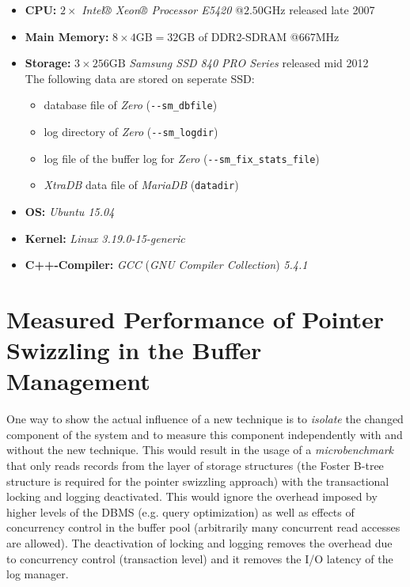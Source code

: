 \begin{@empty}
	\begin{itemize}
		\itemsep0em
		\item	\textbf{CPU:} $2 \times $ \emph{Intel® Xeon® Processor E5420} @$2.50\text{GHz}$ released late 2007
		\item	\textbf{Main Memory:} $8 \times 4\text{GB} = 32\text{GB}$ of DDR2-SDRAM @$667\text{MHz}$
		\item	\textbf{Storage:} $3 \times 256\text{GB}$ \emph{Samsung SSD 840 PRO Series} released mid 2012 \\
			The following data are stored on seperate SSD:
			\begin{itemize}
				\item	database file of \emph{Zero} (\lstinline{--sm_dbfile})
				\item	log directory of \emph{Zero} (\lstinline{--sm_logdir})
				\item	log file of the buffer log for \emph{Zero} (\lstinline{--sm_fix_stats_file})
				\item	\emph{XtraDB} data file of \emph{MariaDB} (\lstinline{datadir})
			\end{itemize}
		\item	\textbf{OS:} \emph{Ubuntu 15.04}
		\item	\textbf{Kernel:} \emph{Linux 3.19.0-15-generic}
		\item	\textbf{C++-Compiler:} \emph{GCC} (\emph{GNU Compiler Collection}) \emph{5.4.1}
	\end{itemize}
\end{@empty}

\section[Measured Performance]{Measured Performance of Pointer Swizzling in the Buffer Management}

	One way to show the actual influence of a new technique is to \emph{isolate} the changed component of the system and to measure this component independently with and without the new technique. This would result in the usage of a \emph{microbenchmark} that only reads records from the layer of storage structures (the Foster B-tree structure is required for the pointer swizzling approach) with the transactional locking and logging deactivated. This would ignore the overhead imposed by higher levels of the DBMS (e.g. query optimization) as well as effects of concurrency control in the buffer pool (arbitrarily many concurrent read accesses are allowed). The deactivation of locking and logging removes the overhead due to concurrency control (transaction level) and it removes the I/O latency of the log manager. 
	
